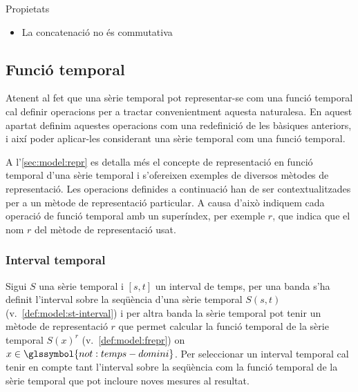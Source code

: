 Propietats
\begin{itemize}
\item La concatenació no és commutativa
\end{itemize}







\subsection{Funció temporal}
\label{sec:sgst:operadors-temporals}

Atenent al fet que una sèrie temporal pot representar-se com una funció
temporal cal definir operacions per a tractar convenientment aquesta
naturalesa.
En aquest apartat definim aquestes operacions com una redefinició de
les bàsiques anteriors, i així poder aplicar-les considerant una sèrie
temporal com una funció temporal.  


A l'\autoref{sec:model:repr} es detalla més el concepte de
representació en funció temporal d'una sèrie temporal i s'ofereixen
exemples de diversos mètodes de representació. Les operacions
definides a continuació han de ser contextualitzades per a un mètode
de representació particular. A causa d'això indiquem cada operació de
funció temporal amb un superíndex, per exemple $r$, que indica que el
nom $r$ del mètode de representació usat.





\subsubsection{Interval temporal}

Sigui $S$ una sèrie temporal i $[s,t]$ un interval de temps, per una
banda s'ha definit l'interval sobre la seqüència d'una sèrie temporal
$S(s,t)$ (v.\ \autoref{def:model:st-interval}) i per altra banda la
sèrie temporal pot tenir un mètode de representació $r$ que permet
calcular la funció temporal de la sèrie temporal $S(x)^r$ (v.\
\autoref{def:model:frepr}) on $x\in\glssymbol{not:temps-domini}$.  Per
seleccionar un interval temporal cal tenir en compte tant l'interval
sobre la seqüència com la funció temporal de la sèrie
temporal que pot incloure noves mesures al resultat.

